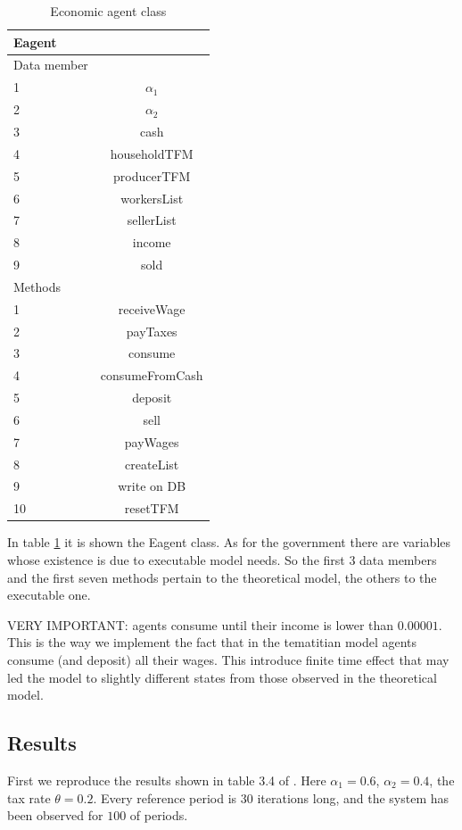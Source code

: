 \documentclass[10pt,a4paper]{article}
\begin{document}
\begin{table}[h]
\centering
\begin{tabular}{lc}
\toprule
\textbf{Eagent}  & \\
\midrule
Data member & \\
\midrule
1 & $\alpha_1$ \\
2 & $\alpha_2$ \\
3 &cash \\
4 & householdTFM \\
5 & producerTFM \\
6 & workersList \\
7 & sellerList\\
8 & income\\
9 & sold\\
\midrule
Methods & \\
\midrule
1 & receiveWage \\
2 & payTaxes\\
3 & consume \\
4 & consumeFromCash\\
5 & deposit\\
6 & sell\\
7 & payWages\\
8 & createList\\
9 & write on DB\\
10 & resetTFM\\
\bottomrule
\end{tabular}
\caption{Economic agent class}
\label{EagentClass}
\end{table}
In table \ref{EagentClass} it is shown the Eagent class. As for the government there are variables whose existence is due to executable model needs. So the first 3 data members and the first seven methods pertain to the theoretical model, the others to the executable one.


VERY IMPORTANT: agents consume until their income is lower than $0.00001$. This is the way we implement the fact that in the tematitian model agents consume (and deposit) all their wages. This introduce finite time effect that may led the model to slightly different states from those observed in the theoretical model.
\subsection{Results}

First we reproduce the results shown in table 3.4 of \cite{godley2006monetary}. Here $\alpha_1 = 0.6$, $\alpha_2 = 0.4$, the tax rate $\theta = 0.2$. Every reference period is $30$ iterations long, and the system has been observed for $100$ of periods.
\end{document}
